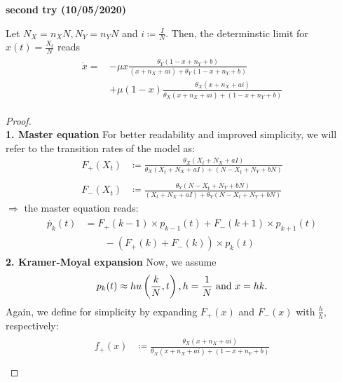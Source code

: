\textbf{second try (10/05/2020)}
\begin{prop}\label{result_2}
	Let $N_X = n_X N, N_Y = n_Y N$ and $i \coloneqq \frac{I}{N}$. Then, the determinstic limit for $x\left(t\right) = \frac{X_t}{N}$ reads
	\begin{align*}
	\begin{split}
	\dot{x} = &-\mu x\frac{\theta_Y(1-x+n_Y+b)}{(x+n_X+ai) + \theta_Y(1-x+n_Y+b)}\\
	\qquad&+ \mu \left(1-x\right)\frac{\theta_X (x+ n_X+ ai)}{\theta_X (x + n_X + ai) + (1-x + n_Y + b)}
	\end{split}
	\end{align*}
\end{prop}
\begin{proof}\phantom{lol}\\
	\textbf{1. Master equation}\newline
	For better readability and improved simplicity, we will refer to the transition rates of the model as:
	\begin{align*}
	F_+ \left(X_t\right) &\coloneqq\frac{\theta_X (X_t + N_X + aI)}{\theta_X (X_t + N_X + aI) + (N-X_t + N_Y + bN)} \\
	&\\
	F_- \left(X_t\right) &\coloneqq\frac{\theta_Y(N-X_t + N_Y + bN)}{(X_t + N_X + aI) + \theta_Y(N-X_t + N_Y + bN)}
	\end{align*}
	$\Rightarrow$ the master equation reads:
	\begin{align}\label{eq:master_eq_2}
	\begin{split}
	\dot{p_k}\left(t\right) &= F_+ \left(k-1\right)\times p_{k-1}\left(t\right) + F_- \left(k+1\right)\times p_{k+1}\left(t\right)\\
		&\qquad - \left(F_+\left(k\right) + F_-\left(k\right)\right)\times p_k\left(t\right)
	\end{split}
	\end{align}
	\textbf{2. Kramer-Moyal expansion}\newline
	Now, we assume
	\begin{equation}\label{assumptions_2}
		p_k(t) \approx hu\left(\frac{k}{N}, t\right), h=\frac{1}{N}\textnormal{ and }x = hk.
	\end{equation} 
	Again, we define for simplicity by expanding $F_+(x)$ and $F_-(x)$ with $\frac{h}{h}$, respectively:
	\begin{align}\label{def:daggers_2}
	\begin{split}
	f_+(x) &\coloneqq \frac{\theta_X (x+ n_X+ ai)}{\theta_X (x + n_X + ai) + (1-x + n_Y + b)}\\

\end{split}
\end{align}
\end{proof}
